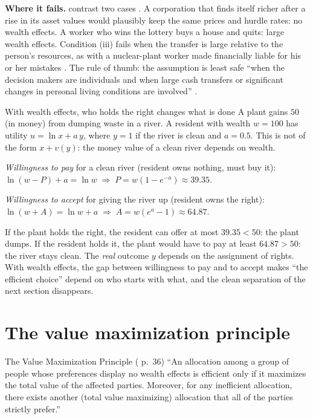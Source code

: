 \textbf{Where it fails.} \MR{} contrast two cases . A corporation that finds itself
richer after a rise in its asset values would plausibly keep the same prices and hurdle rates:
no wealth effects. A worker who wins the lottery buys a house and quits: large wealth effects.
Condition (iii) fails when the transfer is large relative to the person's resources, as with a
nuclear-plant worker made financially liable for his or her mistakes . The rule of thumb:
the assumption is least safe ``when the decision makers are individuals and when large cash
transfers or significant changes in personal living conditions are involved'' .

\begin{example}{With wealth effects, who holds the right changes what is done}
A plant gains $50$ (in money) from dumping waste in a river. A resident with wealth $w = 100$ has
utility $u = \ln x + a\,y$, where $y = 1$ if the river is clean and $a = 0.5$. This is not of
the form $x + v(y)$: the money value of a clean river depends on wealth.

\emph{Willingness to pay} for a clean river (resident owns nothing, must buy it):
$\ln(w - P) + a = \ln w \;\Rightarrow\; P = w(1 - e^{-a}) \approx 39.35$.

\emph{Willingness to accept} for giving the river up (resident owns the right):
$\ln(w + A) = \ln w + a \;\Rightarrow\; A = w(e^{a} - 1) \approx 64.87$.

If the plant holds the right, the resident can offer at most $39.35 < 50$: the plant dumps. If
the resident holds it, the plant would have to pay at least $64.87 > 50$: the river stays
clean. The \emph{real} outcome $y$ depends on the assignment of rights. With wealth effects, the
gap between willingness to pay and to accept makes ``the efficient choice'' depend on who starts
with what, and the clean separation of the next section disappears.
\end{example}

\section{The value maximization principle}\label{sec:b-vmp}

\begin{prop}{The Value Maximization Principle (\MR{} p.~36)}
``An allocation among a group of people whose preferences display no wealth effects is efficient
only if it maximizes the total value of the affected parties. Moreover, for any inefficient
allocation, there exists another (total value maximizing) allocation that all of the parties
strictly prefer.''
\end{prop}

